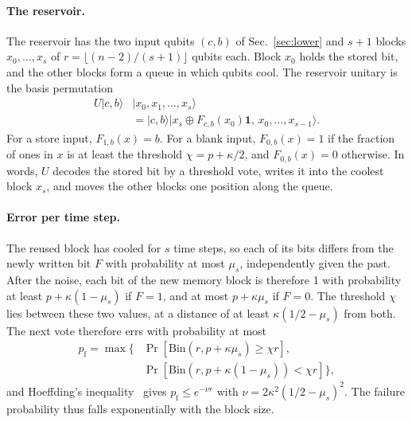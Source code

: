 \documentclass[aps,pra,reprint,superscriptaddress,floatfix]{revtex4-2}
\theoremstyle{plain}
\newcommand{\ket}[1]{|#1\rangle}
\begin{document}
\paragraph*{The reservoir.}
The reservoir has the two input qubits $(c,b)$ of Sec.~\ref{sec:lower} and $s+1$ blocks $x_0,\dots,x_s$ of $r=\lfloor(n-2)/(s+1)\rfloor$ qubits each. Block $x_0$ holds the stored bit, and the other blocks form a queue in which qubits cool. The reservoir unitary is the basis permutation
\begin{align}
U\ket{c,b}&\ket{x_0,x_1,\dots,x_s}\nonumber\\
&=\ket{c,b}\ket{x_s\oplus F_{c,b}(x_0)\bm1,\,x_0,\dots,x_{s-1}}.
\end{align}
For a store input, $F_{1,b}(x)=b$. For a blank input, $F_{0,b}(x)=1$ if the fraction of ones in $x$ is at least the threshold $\chi=p+\kappa/2$, and $F_{0,b}(x)=0$ otherwise. In words, $U$ decodes the stored bit by a threshold vote, writes it into the coolest block $x_s$, and moves the other blocks one position along the queue.

\paragraph*{Error per time step.}
The reused block has cooled for $s$ time steps, so each of its bits differs from the newly written bit $F$ with probability at most $\mu_s$, independently given the past. After the noise, each bit of the new memory block is therefore 1 with probability at least $p+\kappa(1-\mu_s)$ if $F=1$, and at most $p+\kappa\mu_s$ if $F=0$. The threshold $\chi$ lies between these two values, at a distance of at least $\kappa(1/2-\mu_s)$ from both. The next vote therefore errs with probability at most
\begin{align}
p_{\mathrm f}=\max\bigl\{&\Pr[\mathrm{Bin}(r,p+\kappa\mu_s)\ge\chi r],\nonumber\\
&\Pr[\mathrm{Bin}(r,p+\kappa(1-\mu_s))<\chi r]\bigr\},
\end{align}
and Hoeffding's inequality~\cite{Hoeffding1963} gives $p_{\mathrm f}\le e^{-\nu r}$ with $\nu=2\kappa^2(1/2-\mu_s)^2$. The failure probability thus falls exponentially with the block size.
\end{document}
